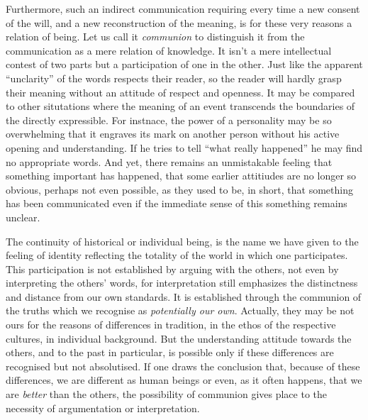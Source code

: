 Furthermore, such an indirect communication requiring every time a new consent
of the will, and a new reconstruction of the meaning, is for these very reasons
a relation of being. Let us call it {\em communion} to distinguish it from the
communication as a mere relation of knowledge.
It isn't a mere intellectual contest of two parts but a
participation of one in the other. Just like the apparent ``unclarity'' of
the words respects their reader, so the reader will hardly grasp their meaning
without an attitude of respect and openness.
It may be compared to other situtations where the meaning of an event
transcends the boundaries of the directly expressible. For instnace, the power 
of a personality may be so overwhelming that it engraves its mark on another 
person
without his active opening and understanding. If he tries to tell ``what
really happened'' he may find no appropriate words. And yet, there remains an
unmistakable feeling that something important has happened, that some earlier
attitiudes are no longer so obvious, perhaps not even possible, as they used
to be, in short, that something has been communicated even if the immediate
sense of this something remains unclear.

The continuity of historical or individual being, is 
the name we have given to the feeling of identity reflecting the totality
of the world in which one participates.
 This participation is not established by arguing with the others, not even by
interpreting the others' words, for interpretation still emphasizes the distinctness 
and distance from our own standards. It is established
through the communion of the truths which we recognise as {\em potentially 
our own}. Actually, they may be not ours for the reasons of differences in 
tradition, in the ethos of the respective cultures, in individual background.
But the understanding attitude towards the others, and to the past in 
particular, is possible only if these differences are recognised but not
absolutised. If one draws the conclusion that, because of these differences, we
are different as human beings or even, as it often happens, that  we are 
{\em better} than the others, the possibility of communion gives place to
the necessity of argumentation or interpretation.

